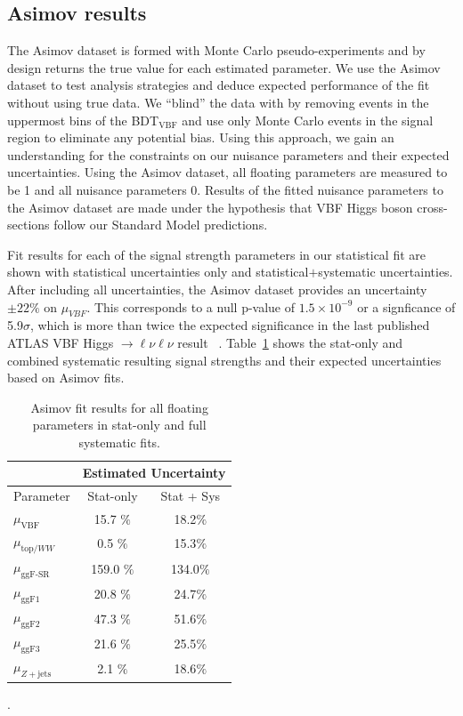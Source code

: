 \subsection{Asimov results}
The Asimov dataset is formed with Monte Carlo pseudo-experiments and by design returns the true value for each estimated parameter. We use the Asimov dataset to test analysis strategies and deduce expected performance of the fit without using true data. We ``blind'' the data with by removing events in the uppermost bins of the BDT$_{\text{VBF}}$ and use only Monte Carlo events in the signal region to eliminate any potential bias. Using this approach, we gain an understanding for the constraints on our nuisance parameters and their expected uncertainties. Using the Asimov dataset, all floating parameters are measured to be 1 and all nuisance parameters 0. Results of the fitted nuisance parameters to the Asimov dataset are made under the hypothesis that VBF Higgs boson cross-sections follow our Standard Model predictions. 

Fit results for each of the signal strength parameters in our statistical fit are shown with statistical uncertainties only and statistical$+$systematic uncertainties. After including all uncertainties, the Asimov dataset provides an uncertainty $\pm22\%$ on $\mu_{VBF}$. This corresponds to a null p-value of $1.5\times10^{-9}$ or a signficance of 5.9$\sigma$, which is more than twice the expected significance in the last published ATLAS VBF Higgs $\rightarrow \ell\nu\ell\nu$ result ~\cite{Aaboud_2019}. Table~\ref{tab:muresults} shows the stat-only and combined systematic resulting signal strengths and their expected uncertainties based on Asimov fits. 

\begin{table}[!h]
  \begin{center}
    \begin{tabular}{l|c|c|}
	& \multicolumn{2}{|c|}{Estimated Uncertainty}\\
       \hline
        Parameter & Stat-only    & Stat + Sys \\
      \hline
       $\mu_{\text{VBF}}$ & 15.7 $\%$ & 18.2$\%$ \\
       $\mu_{\text{top/}WW}$ & 0.5 $\%$ & 15.3$\%$\\
       $\mu_{\text{ggF-SR}}$ & 159.0 $\%$ & 134.0$\%$ \\
       $\mu_{\text{ggF1}}$ & 20.8 $\%$ & 24.7$\%$ \\
       $\mu_{\text{ggF2}}$ & 47.3 $\%$ & 51.6$\%$ \\
       $\mu_{\text{ggF3}}$ & 21.6 $\%$ & 25.5$\%$ \\
       $\mu_{Z+\text{jets}}$ & 2.1 $\%$ & 18.6$\%$ \\
    \end{tabular}
    \caption{Asimov fit results for all floating parameters in stat-only and full systematic fits.}.
    \label{tab:muresults}
  \end{center}
\end{table}

